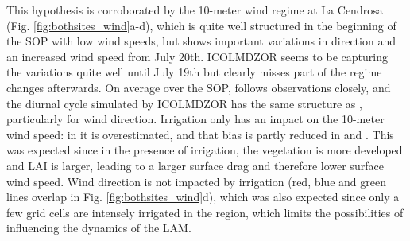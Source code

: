 This hypothesis is corroborated by the 10-meter wind regime at La Cendrosa (Fig. \ref{fig:bothsites_wind}a-d), which is quite well structured in the beginning of the SOP with low wind speeds, but shows important variations in direction and an increased wind speed from July 20th. ICOLMDZOR seems to be capturing the variations quite well until July 19th but clearly misses part of the regime changes afterwards. 
On average over the SOP, \mesoexact follows observations closely, and the diurnal cycle simulated by ICOLMDZOR has the same structure as \mesomean, particularly for wind direction.
Irrigation only has an impact on the 10-meter wind speed: in \noirr it is overestimated, and that bias is partly reduced in \irr and \irrboost. This was expected since in the presence of irrigation, the vegetation is more developed and LAI is larger, leading to a larger surface drag and therefore lower surface wind speed. 
Wind direction is not impacted by irrigation (red, blue and green lines overlap in Fig. \ref{fig:bothsites_wind}d), which was also expected since only a few grid cells are intensely irrigated in the region, which limits the possibilities of influencing the dynamics of the LAM.

